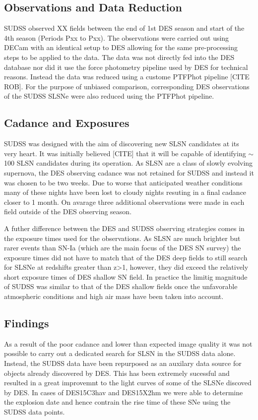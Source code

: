 \subsection{Observations and Data Reduction}
SUDSS observed XX fields between the end of 1st DES season and start of the 4th season (Periods Pxx to Pxx). The observations were carried out using DECam with an identical setup to DES allowing for the same pre-processing steps to be applied to the data. The data was not directly fed into the DES database nor did it use the force photometry pipeline used by DES for technical reasons. Instead the data was reduced using a custome PTFPhot pipeline [CITE ROB]. For the purpose of unbiased comparison, corresponding DES observations of the SUDSS SLSNe were also reduced using the PTFPhot pipeline.

\subsection{Cadance and Exposures}
\label{sec:SUDSSCadance}
SUDSS was designed with the aim of discovering new SLSN candidates at its very heart. It was initially believed [CITE] that it will be capable of identifying $\sim$ 100 SLSN candidates during its operation. As SLSN are a class of slowly evolving supernova, the DES observing cadance was not retained for SUDSS and instead it was chosen to be two weeks. Due to worse that anticipated weather conditions many of these nights have been lost to cloudy nights resuting in a final cadance closer to 1 month. On avarage three additional observations were made in each field outside of the DES observing season.

A futher difference between the DES and SUDSS observing strategies comes in the exposure times used for the observations. As SLSN are much brighter but rarer events than SN-Ia (which are the main focus of the DES SN survey) the exposure times did not have to match that of the DES deep fields to still search for SLSNe at redshifts greater than z>1, however, they did exceed the relatively short exposure times of DES shallow SN field. In practice the limitig magnitude of SUDSS was similar to that of the DES shallow fields once the unfavorable atmospheric conditions and high air mass have been taken into account.

\subsection{Findings}
\label{sec:SUDSSIssues}
As a result of the poor cadance and lower than expected image quality it was not possible to carry out a dedicated search for SLSN in the SUDSS data alone. Instead, the SUDSS data have been repurposed as an auxilary data source for objects already discovered by DES. This has been extremely sucessful and resulted in a great improvemnt to the light curves of some of the SLSNe discoved by DES. In cases of DES15C3hav and DES15X2hm we were able to determine the explosion date and hence contrain the rise time of these SNe using the SUDSS data points.

